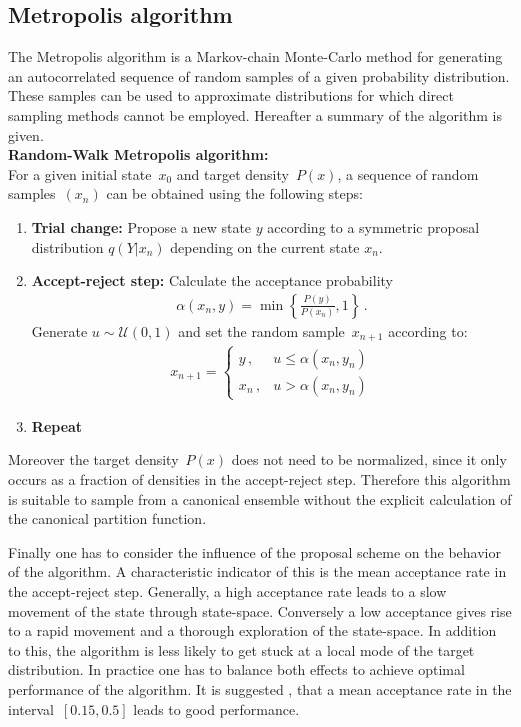 \documentclass[11pt, a4paper]{article}
\numberwithin{equation}{section}
\begin{document}
\subsection{Metropolis algorithm} \label{sec:Metropolis}
The Metropolis algorithm is a Markov-chain Monte-Carlo method for generating an autocorrelated sequence of random samples of a given probability distribution.
These samples can be used to approximate distributions for which direct sampling methods cannot be employed.
Hereafter a summary of the algorithm is given.\\

\noindent\textbf{Random-Walk Metropolis algorithm:}\\
For a given initial state~$x_0$ and target density~$P(x)$, a sequence of random samples~$\left( x_n \right)$ can be obtained using the following steps:
\begin{enumerate}
	\item \textbf{Trial change:}
		Propose a new state $y$ according to a symmetric proposal distribution $q(Y|x_n)$ depending on the current state $x_n$.
		
	\item \textbf{Accept-reject step:}
		Calculate the acceptance probability
		\begin{align}
			\alpha(x_n, y) = \min\left\{ \frac{P(y)}{P(x_n)}, 1\right\} \,\text{.}
			\label{eq:acceptance_probability}
		\end{align}
		Generate $u \sim \mathcal{U}(0, 1)$ and set the random sample~$x_{n+1}$ according to:
		\begin{align*}
			x_{n+1} = \begin{cases}
					y \,, & u \leq \alpha(x_n, y_n) \\
					x_n \,, & u > \alpha(x_n, y_n)
				\end{cases}
		\end{align*}
		
	\item \textbf{Repeat}
\end{enumerate}
Moreover the target density~$P(x)$ does not need to be normalized, since it only occurs as a fraction of densities in the accept-reject step.
Therefore this algorithm is suitable to sample from a canonical ensemble without the explicit calculation of the canonical partition function.

Finally one has to consider the influence of the proposal scheme on the behavior of the algorithm.
A characteristic indicator of this is the mean acceptance rate in the accept-reject step.
Generally, a high acceptance rate leads to a slow movement of the state through state-space.
Conversely a low acceptance gives rise to a rapid movement and a thorough exploration of the state-space.
In addition to this, the algorithm is less likely to get stuck at a local mode of the target distribution.
In practice one has to balance both effects to achieve optimal performance of the algorithm.
It is suggested \cite{gilks_richardson}, that a mean acceptance rate in the interval~$[0.15, 0.5]$ leads to good performance.
\end{document}
